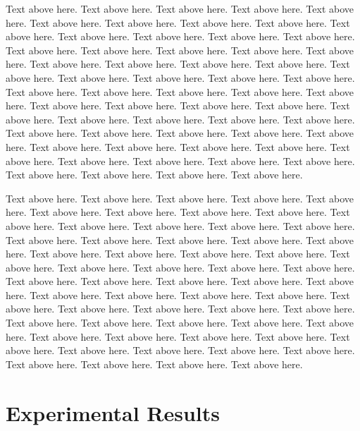 \documentclass{sig-alternate}
\begin{document}
Text above here. Text above here. Text above here. Text above here. Text above here. Text above here. Text above here. Text above here. Text above here. Text above here. Text above here. Text above here. Text above here. Text above here. Text above here. Text above here. Text above here. Text above here. Text above here. Text above here. Text above here. Text above here. Text above here. Text above here. Text above here. Text above here. Text above here. Text above here. Text above here. Text above here. Text above here. Text above here. Text above here. Text above here. Text above here. Text above here. Text above here. Text above here. Text above here. Text above here. Text above here. Text above here. Text above here. Text above here. Text above here. Text above here. Text above here. Text above here. Text above here. Text above here. Text above here. Text above here. Text above here. Text above here. Text above here. Text above here. Text above here. Text above here. Text above here. Text above here. 

Text above here. Text above here. Text above here. Text above here. Text above here. Text above here. Text above here. Text above here. Text above here. Text above here. Text above here. Text above here. Text above here. Text above here. Text above here. Text above here. Text above here. Text above here. Text above here. Text above here. Text above here. Text above here. Text above here. Text above here. Text above here. Text above here. Text above here. Text above here. Text above here. Text above here. Text above here. Text above here. Text above here. Text above here. Text above here. Text above here. Text above here. Text above here. Text above here. Text above here. Text above here. Text above here. Text above here. Text above here. Text above here. Text above here. Text above here. Text above here. Text above here. Text above here. Text above here. Text above here. Text above here. Text above here. Text above here. Text above here. Text above here. Text above here. Text above here. Text above here. 

\section{Experimental Results}
\end{document}
